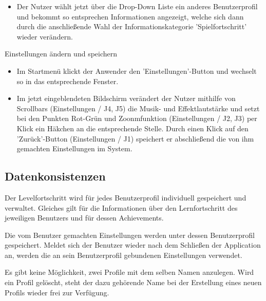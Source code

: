 \begin{requirements}
\begin{itemize}
		\item Der Nutzer wählt jetzt über die Drop-Down Liste ein anderes Benutzerprofil und bekommt so entsprechen Informationen angezeigt, welche sich dann durch die anschließende Wahl der Informationskategorie 'Spielfortschritt' wieder verändern.
		
  	
  	\end{itemize}
  	
  	
  	
  	 Einstellungen ändern und speichern
  	
  	
  	\begin{itemize}
  	
		\item Im Startmenü klickt der Anwender den 'Einstellungen'-Button und wechselt so in das entsprechende Fenster.
		
		\item Im jetzt eingeblendeten Bildschirm verändert der Nutzer mithilfe von Scrollbars (Einstellungen / J4, J5) die Musik- und Effektlautstärke und setzt bei den Punkten Rot-Grün und Zoonmfunktion (Einstellungen / J2, J3) per Klick ein Häkchen an die entsprechende Stelle. Durch einen Klick auf den 'Zurück'-Button (Einstellungen / J1) speichert er abschließend die von ihm gemachten Einstellungen im System.
  	
  	\end{itemize}
  	
  	
\end{requirements}
  		
\subsection{Datenkonsistenzen}

\begin{requirements}
  		
  	 Der Levelfortschritt wird für jedes Benutzerprofil individuell gespeichert und verwaltet. Gleiches gilt für die Informationen über den Lernfortschritt des jeweiligen Benutzers und für dessen Achievements.
  		
	 Die vom Benutzer gemachten Einstellungen werden unter dessen Benutzerprofil gespeichert. Meldet sich der Benutzer wieder nach dem Schließen der Application an, werden die an sein Benutzerprofil gebundenen Einstellungen verwendet.
	
	 Es gibt keine Möglichkeit, zwei Profile mit dem selben Namen anzulegen. Wird ein Profil gelöscht, steht der dazu gehörende Name bei der Erstellung eines neuen Profils wieder frei zur Verfügung.

\end{requirements}	
  			
  		
